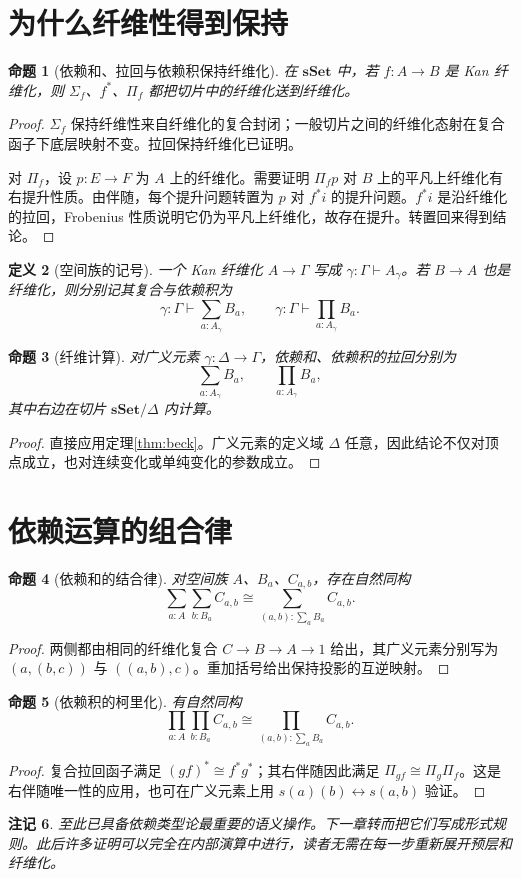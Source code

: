 \documentclass[12pt,oneside,openany,fontset=none]{ctexbook}
\theoremstyle{cn}
\newtheorem{definition}{定义}[chapter]
\newtheorem{proposition}[definition]{命题}
\newtheorem{remark}[definition]{注记}
\numberwithin{equation}{chapter}
\newcommand{\sSet}{\mathbf{sSet}}
\begin{document}
\section{为什么纤维性得到保持}
\begin{proposition}[依赖和、拉回与依赖积保持纤维化]
在 $\sSet$ 中，若 $f:A\to B$ 是 Kan 纤维化，则 $\Sigma_f$、$f^*$、$\Pi_f$ 都把切片中的纤维化送到纤维化。
\end{proposition}
\begin{proof}
$\Sigma_f$ 保持纤维性来自纤维化的复合封闭；一般切片之间的纤维化态射在复合函子下底层映射不变。拉回保持纤维化已证明。

对 $\Pi_f$，设 $p:E\to F$ 为 $A$ 上的纤维化。需要证明 $\Pi_fp$ 对 $B$ 上的平凡上纤维化有右提升性质。由伴随，每个提升问题转置为 $p$ 对 $f^*i$ 的提升问题。$f^*i$ 是沿纤维化的拉回，Frobenius 性质说明它仍为平凡上纤维化，故存在提升。转置回来得到结论。
\end{proof}
\begin{definition}[空间族的记号]
一个 Kan 纤维化 $A\to\Gamma$ 写成 $\gamma:\Gamma\vdash A_\gamma$。若 $B\to A$ 也是纤维化，则分别记其复合与依赖积为
\[
\gamma:\Gamma\vdash\sum_{a:A_\gamma}B_a,
\qquad
\gamma:\Gamma\vdash\prod_{a:A_\gamma}B_a.
\]
\end{definition}
\begin{proposition}[纤维计算]
对广义元素 $\gamma:\Delta\to\Gamma$，依赖和、依赖积的拉回分别为
\[
\sum_{a:A_\gamma}B_a,
\qquad\prod_{a:A_\gamma}B_a,
\]
其中右边在切片 $\sSet/\Delta$ 内计算。
\end{proposition}
\begin{proof}
直接应用定理\ref{thm:beck}。广义元素的定义域 $\Delta$ 任意，因此结论不仅对顶点成立，也对连续变化或单纯变化的参数成立。
\end{proof}

\section{依赖运算的组合律}
\begin{proposition}[依赖和的结合律]
对空间族 $A$、$B_a$、$C_{a,b}$，存在自然同构
\[
\sum_{a:A}\sum_{b:B_a}C_{a,b}
\cong\sum_{(a,b):\sum_aB_a}C_{a,b}.
\]
\end{proposition}
\begin{proof}
两侧都由相同的纤维化复合 $C\to B\to A\to1$ 给出，其广义元素分别写为 $(a,(b,c))$ 与 $((a,b),c)$。重加括号给出保持投影的互逆映射。
\end{proof}
\begin{proposition}[依赖积的柯里化]
有自然同构
\[
\prod_{a:A}\prod_{b:B_a}C_{a,b}
\cong\prod_{(a,b):\sum_aB_a}C_{a,b}.
\]
\end{proposition}
\begin{proof}
复合拉回函子满足 $(gf)^*\cong f^*g^*$；其右伴随因此满足 $\Pi_{gf}\cong\Pi_g\Pi_f$。这是右伴随唯一性的应用，也可在广义元素上用 $s(a)(b)\leftrightarrow s(a,b)$ 验证。
\end{proof}
\begin{remark}
至此已具备依赖类型论最重要的语义操作。下一章转而把它们写成形式规则。此后许多证明可以完全在内部演算中进行，读者无需在每一步重新展开预层和纤维化。
\end{remark}
\end{document}
